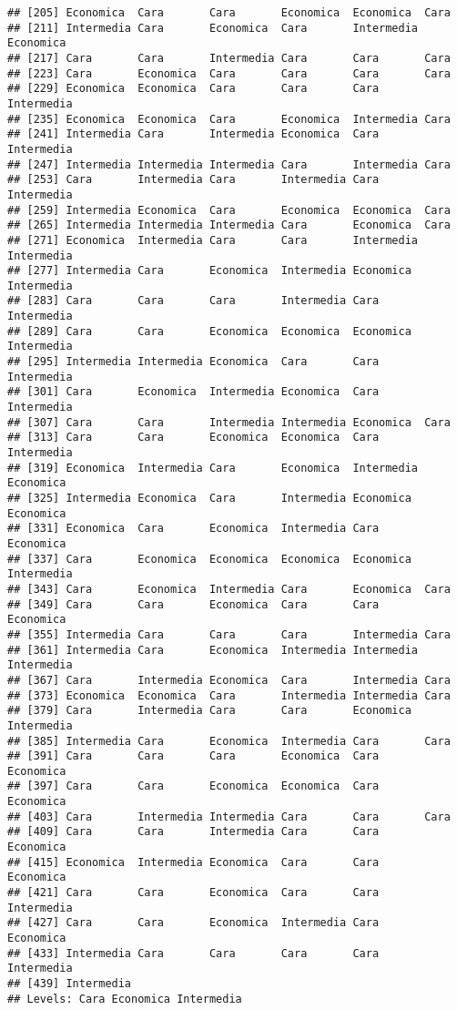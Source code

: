 \documentclass[
]{article}
\begin{document}
\begin{verbatim}
## [205] Economica  Cara       Cara       Economica  Economica  Cara      
## [211] Intermedia Cara       Economica  Cara       Intermedia Economica 
## [217] Cara       Cara       Intermedia Cara       Cara       Cara      
## [223] Cara       Economica  Cara       Cara       Cara       Cara      
## [229] Economica  Economica  Cara       Cara       Cara       Intermedia
## [235] Economica  Economica  Cara       Economica  Intermedia Cara      
## [241] Intermedia Cara       Intermedia Economica  Cara       Intermedia
## [247] Intermedia Intermedia Intermedia Cara       Intermedia Cara      
## [253] Cara       Intermedia Cara       Intermedia Cara       Intermedia
## [259] Intermedia Economica  Cara       Economica  Economica  Cara      
## [265] Intermedia Intermedia Intermedia Cara       Economica  Cara      
## [271] Economica  Intermedia Cara       Cara       Intermedia Intermedia
## [277] Intermedia Cara       Economica  Intermedia Economica  Intermedia
## [283] Cara       Cara       Cara       Intermedia Cara       Intermedia
## [289] Cara       Cara       Economica  Economica  Economica  Intermedia
## [295] Intermedia Intermedia Economica  Cara       Cara       Intermedia
## [301] Cara       Economica  Intermedia Economica  Cara       Intermedia
## [307] Cara       Cara       Intermedia Intermedia Economica  Cara      
## [313] Cara       Cara       Economica  Economica  Cara       Intermedia
## [319] Economica  Intermedia Cara       Economica  Intermedia Economica 
## [325] Intermedia Economica  Cara       Intermedia Economica  Economica 
## [331] Economica  Cara       Economica  Intermedia Cara       Economica 
## [337] Cara       Economica  Economica  Economica  Economica  Intermedia
## [343] Cara       Economica  Intermedia Cara       Economica  Cara      
## [349] Cara       Cara       Economica  Cara       Cara       Economica 
## [355] Intermedia Cara       Cara       Cara       Intermedia Cara      
## [361] Intermedia Cara       Economica  Intermedia Intermedia Intermedia
## [367] Cara       Intermedia Economica  Cara       Intermedia Cara      
## [373] Economica  Economica  Cara       Intermedia Intermedia Cara      
## [379] Cara       Intermedia Cara       Cara       Economica  Intermedia
## [385] Intermedia Cara       Economica  Intermedia Cara       Cara      
## [391] Cara       Cara       Cara       Economica  Cara       Economica 
## [397] Cara       Cara       Economica  Economica  Cara       Economica 
## [403] Cara       Intermedia Intermedia Cara       Cara       Cara      
## [409] Cara       Cara       Intermedia Cara       Cara       Economica 
## [415] Economica  Intermedia Economica  Cara       Cara       Economica 
## [421] Cara       Cara       Economica  Cara       Cara       Intermedia
## [427] Cara       Cara       Economica  Intermedia Cara       Economica 
## [433] Intermedia Cara       Cara       Cara       Cara       Intermedia
## [439] Intermedia
## Levels: Cara Economica Intermedia
\end{verbatim}
\end{document}
